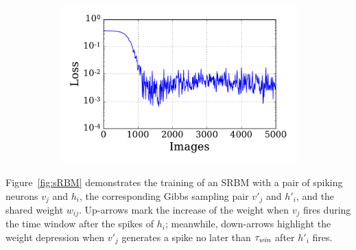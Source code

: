\begin{figure}
\begin{subfigure}[t]{0.48\textwidth}
		\caption{}
	\end{subfigure}
	\begin{subfigure}[t]{0.48\textwidth}
		\includegraphics[width=\textwidth]{pics_sdlm/10_exp_SRBM_Orig/exp2_mse_nons.pdf}
		\caption{}
	\end{subfigure}
	\caption[SRBM training of the reconstruction tests.]{}
	\label{fig:srbm_orig}
\end{figure}

\DIFaddend Figure~\ref{fig:sRBM} demonstrates the training of an SRBM with a pair of spiking neurons $v_j$ and $h_i$, the corresponding \DIFaddbegin {}\DIFaddend Gibbs sampling pair $v'_j$ and $h'_i$, and the shared weight $w_{ij}$.
Up-arrows mark the increase of the weight when $v_j$ fires during the time window after the spikes of $h_i$;
meanwhile, down-arrows highlight	 the weight depression when $v'_j$ generates a spike no later than $\tau_{\textit{\textrm{win}}}$ after $h'_i$ fires.







